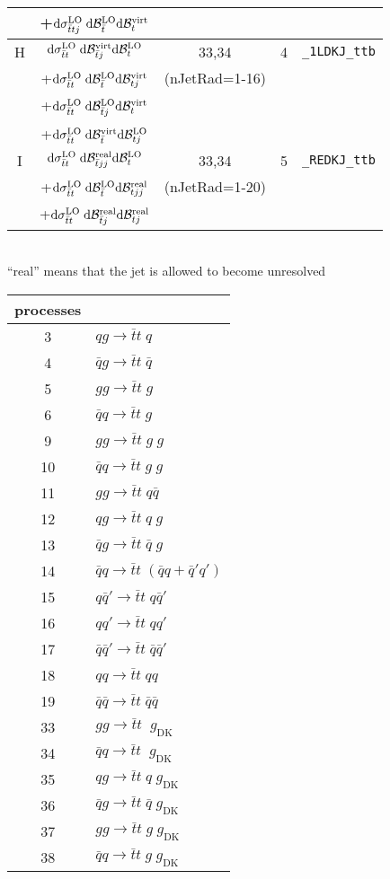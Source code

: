 \documentclass[12pt]{article}
\begin{document}
\begin{tabular}{ c  c  c  c  c }
      &   +$\dsj^\LO \dBtb^\LO \dBt^\VI   $ &   &   \\
\midrule
    H &   $\ds^\LO \dBtbj^\VI \dBt^\LO   $ & 33,34  &  4 &  \texttt{\_1LDKJ\_ttb}\\
      &  +$\ds^\LO \dBtb^\LO \dBtj^\VI   $ & (nJetRad=1-16) &   & \\
      &  +$\ds^\LO \dBtbj^\LO \dBt^\VI   $ &   &   &  \\
      &  +$\ds^\LO \dBtb^\VI \dBtj^\LO   $ &   &   &  \\
\midrule
    I &    $\ds^\LO \dBtbjj^\RE \dBt^\LO   $ & 33,34  &  5 &  \texttt{\_REDKJ\_ttb} \\
      &   +$\ds^\LO \dBtb^\LO \dBtjj^\RE   $ &  (nJetRad=1-20) &   \\
      &   +$\ds^\LO \dBtbj^\RE \dBtj^\RE   $ &   &   \\
\midrule
\end{tabular}
\\
``real'' means that the jet is allowed to become unresolved
\\




\newpage




\newcommand{\ttb}{\rightarrow \bar{t}t\;}
\newcommand{\qb}{\bar{q}}
\newcommand{\gDK}{\;g_\mathrm{DK}}

\begin{tabular}{ c  l }
\midrule
   processes \\
\midrule
   3 & $qg \ttb q $ \\
   4 & $\qb g \ttb \qb $   \\
   5 & $gg \ttb g $   \\
   6 & $\qb q \ttb g $   \\
   9 & $gg \ttb g \;g$   \\
  10 & $\qb q \ttb g \; g$   \\
  11 & $gg \ttb q\qb $  \\
  12 & $q g \ttb q \; g$   \\
  13 & $\qb g \ttb \qb \; g$   \\
  14 & $\qb q \ttb (\qb q + \qb' q')$   \\
  15 & $q \qb' \ttb q \qb'$   \\
  16 & $q q' \ttb q q'$   \\
  17 & $\qb \qb' \ttb \qb \qb'  $   \\
  18 & $q q \ttb q q $   \\
  19 & $\qb \qb \ttb \qb \qb$   \\
  33 & $gg \ttb \gDK $   \\
  34 & $\qb q \ttb \gDK $   \\
  35 & $qg \ttb q \gDK $   \\
  36 & $\qb g \ttb \qb \gDK $   \\
  37 & $gg \ttb g  \gDK$   \\
  38 & $\qb q \ttb g \gDK $   \\
\midrule

\end{tabular}
\end{document}
